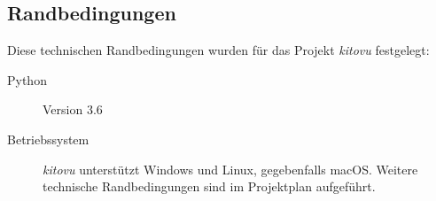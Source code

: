 \documentclass[a4paper]{article}
\begin{document}
\subsection{Randbedingungen}

Diese technischen Randbedingungen wurden für das Projekt \emph{kitovu} festgelegt:

\begin{description}
  \item[Python] Version 3.6
  \item[Betriebssystem] \emph{kitovu} unterstützt Windows und Linux, gegebenfalls macOS. Weitere technische Randbedingungen sind im Projektplan aufgeführt.
\end{description}
\end{document}
